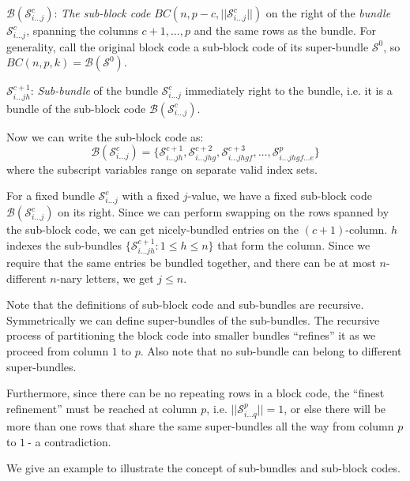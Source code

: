 \documentclass[12pt]{article}  %
\begin{document}
$\mathcal{B}(\mathcal{S}^c_{i\dots j})$: \emph{The sub-block code} $BC(n, p-c, ||\mathcal{S}^c_{i\dots j}||)$ on the right of the \emph{bundle} $\mathcal{S}^c_{i\dots j}$, spanning the columns $c+1,\dots,p$ and the same rows as the bundle. For generality, call the original block code a sub-block code of its super-bundle $\mathcal{S}^0$, so $BC(n,p,k) = \mathcal{B}(\mathcal{S}^0)$.


$\mathcal{S}^{c+1}_{i\dots j h}$: \emph{Sub-bundle} of the bundle $\mathcal{S}^c_{i\dots j}$ immediately right to the bundle, i.e. it is a bundle of the sub-block code $\mathcal{B}(\mathcal{S}^c_{i\dots j})$.

Now we can write the sub-block code as:
$$\mathcal{B}(\mathcal{S}^c_{i\dots j}) = \{
\mathcal{S}^{c+1}_{i\dots j h}, 
\mathcal{S}^{c+2}_{i\dots j h g}, 
\mathcal{S}^{c+3}_{i\dots j h g f}, 
\dots, 
\mathcal{S}^{p}_{i\dots j h g f \dots e}
\}$$
where the subscript variables range on separate valid index sets.

For a fixed bundle $\mathcal{S}^c_{i\dots j}$ with a fixed $j$-value, we have a fixed sub-block code $\mathcal{B}(\mathcal{S}^c_{i\dots j})$ on its right. Since we can perform swapping on the rows spanned by the sub-block code, we can get nicely-bundled entries on the $(c+1)$-column. $h$ indexes the sub-bundles $\{\mathcal{S}^{c+1}_{i\dots j h} : 1 \leq h \leq n \}$ that form the column. Since we require that the same entries be bundled together, and there can be at most $n$-different $n$-nary letters, we get $j \leq n$.


Note that the definitions of sub-block code and sub-bundles are recursive. Symmetrically we can define super-bundles of the sub-bundles. The recursive process of partitioning the block code into smaller bundles ``refines'' it as we proceed from column $1$ to $p$. Also note that no sub-bundle can belong to different super-bundles. 

Furthermore, since there can be no repeating rows in a block code, the ``finest refinement'' must be reached at column $p$, i.e. $||\mathcal{S}^p_{i\dots q}|| = 1$, or else there will be more than one rows that share the same super-bundles all the way from column $p$ to $1\ $-  a contradiction.


We give an example to illustrate the concept of sub-bundles and sub-block codes.
\end{document}
